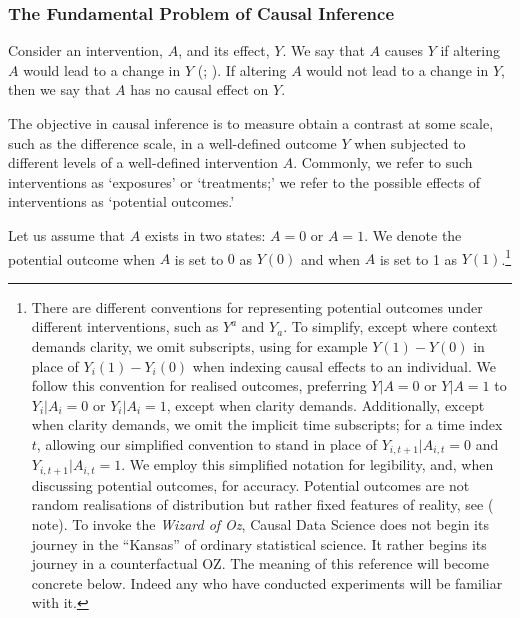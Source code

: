 \documentclass[
  singlecolumn,
  9pt]{article}
\begin{document}
\subsubsection{The Fundamental Problem of Causal
Inference}\label{the-fundamental-problem-of-causal-inference}

Consider an intervention, \(A\), and its effect, \(Y\). We say that
\(A\) causes \(Y\) if altering \(A\) would lead to a change in \(Y\)
(; ). If altering \(A\) would not lead to a change in \(Y\), then we
say that \(A\) has no causal effect on \(Y\).

The objective in causal inference is to measure obtain a contrast at
some scale, such as the difference scale, in a well-defined outcome
\(Y\) when subjected to different levels of a well-defined intervention
\(A\). Commonly, we refer to such interventions as `exposures' or
`treatments;' we refer to the possible effects of interventions as
`potential outcomes.'

Let us assume that \(A\) exists in two states: \(A = 0\) or \(A = 1\).
We denote the potential outcome when \(A\) is set to \(0\) as \(Y(0)\)
and when \(A\) is set to 1 as \(Y(1)\).\footnote{There are different
  conventions for representing potential outcomes under different
  interventions, such as \(Y^a\) and \(Y_a\). To simplify, except where
  context demands clarity, we omit subscripts, using for example
  \(Y(1) - Y(0)\) in place of \(Y_i(1) - Y_i(0)\) when indexing causal
  effects to an individual. We follow this convention for realised
  outcomes, preferring \(Y|A = 0\) or \(Y|A = 1\) to \(Y_i|A_i = 0\) or
  \(Y_i|A_i = 1\), except when clarity demands. Additionally, except
  when clarity demands, we omit the implicit time subscripts; for a time
  index \(t\), allowing our simplified convention to stand in place of
  \(Y_{i,t+1}|A_{i,t} = 0\) and \(Y_{i,t+1}|A_{i,t} = 1\). We employ
  this simplified notation for legibility, and, when discussing
  potential outcomes, for accuracy. Potential outcomes are not random
  realisations of distribution but rather fixed features of reality, see
  ( note). To
  invoke the \emph{Wizard of Oz}, Causal Data Science does not begin its
  journey in the ``Kansas'' of ordinary statistical science. It rather
  begins its journey in a counterfactual OZ. The meaning of this
  reference will become concrete below. Indeed any who have conducted
  experiments will be familiar with it.}
\end{document}
